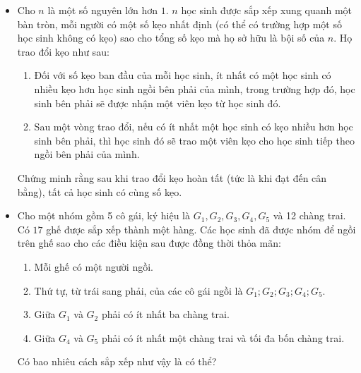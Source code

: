\documentclass[11pt]{scrartcl}
\begin{document}
\begin{itemize}[label=, leftmargin=0em, itemsep=-0em]
\begin{btvn}
    \end{btvn}

    \item \begin{btvn}
        Cho $n$ là một số nguyên lớn hơn $1.$ $n$ học sinh được sắp xếp xung quanh một bàn tròn, mỗi người có một số kẹo nhất định (có thể có trường hợp một số học sinh không có kẹo) sao cho tổng số kẹo mà họ sở hữu là bội số của $n.$ Họ trao đổi kẹo như sau: 
        
        \begin{enumerate}
            \item Đối với số kẹo ban đầu của mỗi học sinh, ít nhất có một học sinh có nhiều kẹo hơn học sinh ngồi bên phải của mình, trong trường hợp đó, học sinh bên phải sẽ được nhận một viên kẹo từ học sinh đó.
            \item Sau một vòng trao đổi, nếu có ít nhất một học sinh có kẹo nhiều hơn học sinh bên phải, thì học sinh đó sẽ trao một viên kẹo cho học sinh tiếp theo ngồi bên phải của mình.
        \end{enumerate}  
        Chứng minh rằng sau khi trao đổi kẹo hoàn tất (tức là khi đạt đến cân bằng), tất cả học sinh có cùng số kẹo.
    \end{btvn}

    \item \begin{btvn}
        Cho một nhóm gồm 5 cô gái, ký hiệu là $G_1,G_2,G_3,G_4,G_5$ và 12 chàng trai. Có $17$ ghế được sắp xếp thành một hàng. Các học sinh đã được nhóm để ngồi trên ghế sao cho các điều kiện sau được đồng thời thỏa mãn:
        \begin{enumerate}[label=(\alph*)]
            \item Mỗi ghế có một người ngồi.
            \item Thứ tự, từ trái sang phải, của các cô gái ngồi là $G_1; G_2; G_3; G_4; G_5.$
            \item Giữa $G_1$ và $G_2$ phải có ít nhất ba chàng trai.
            \item Giữa $G_4$ và $G_5$ phải có ít nhất một chàng trai và tối đa bốn chàng trai.
            
        \end{enumerate} 
    Có bao nhiêu cách sắp xếp như vậy là có thể?
    \end{btvn}


\end{itemize}
\end{document}
